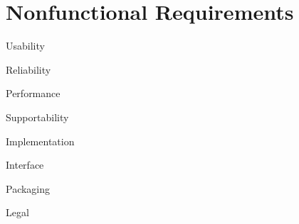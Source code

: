 \section{Nonfunctional Requirements}

{Usability}

{Reliability}

{Performance}

{Supportability}

{Implementation}

{Interface}

{Packaging}

{Legal}



















